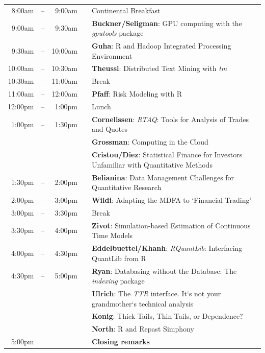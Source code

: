 \documentclass[11pt]{article}
\newcommand{\mylinecolor}[1]{\color{#1}\vspace{-8pt}}  %
\begin{document}
\begin{tabular}{rlrlp{5in}}
  8:00am  & -- &  9:00am &   & \small{\mylinecolor{Breaks} Continental Breakfast}  \\
  9:00am  & -- &  9:30am &   & \textbf{\color{Talk} Buckner/Seligman}: \small{GPU computing with the \emph{gputools} package} \\
  9:30am  & -- & 10:00am &   & \textbf{\color{Talk} Guha}: \small{R and Hadoop Integrated Processing Environment} \\
  10:00am & -- & 10:30am &   & \textbf{\color{Talk} Theussl}: \small{Distributed Text Mining with \emph{tm}} \\
  10:30am & -- & 11:00am &   & \small{\mylinecolor{Breaks}  Break}  \\
  11:00am & -- & 12:00am &   & \textbf{\color{KeynoteTalk} Pfaff}: \small{Risk Modeling with R} \\
  12:00pm & -- &  1:00pm &   & \small{\mylinecolor{Breaks}  Lunch}  \\
   1:00pm & -- &  1:30pm &   & \textbf{\color{LightningTalk} Cornelissen}: \small{\emph{RTAQ}: Tools for Analysis of Trades and Quotes} \\
          &    &         &   & \textbf{\color{LightningTalk} Grossman}: \small{Computing in the Cloud} \\
          &    &         &   & \textbf{\color{LightningTalk} Cristou/Diez}: \small{Statistical Finance for Investors Unfamiliar with Quantitative Methods} \\
   1:30pm & -- & 2:00pm  &   & \textbf{\color{Talk} Belianina}: \small{Data Management Challenges for Quantitative Research} \\
   2:00pm & -- & 3:00pm  &   & \textbf{\color{KeynoteTalk} Wildi}: \small{Adapting the MDFA to `Financial Trading'} \\
   3:00pm & -- & 3:30pm  &   & \small{\mylinecolor{Breaks} Break} \\
   3:30pm & -- & 4:00pm  &   & \textbf{\color{Talk} Zivot}: \small{Simulation-based Estimation of Continuous Time Models} \\
   4:00pm & -- & 4:30pm  &   & \textbf{\color{Talk} Eddelbuettel/Khanh}: \small{\emph{RQuantLib}: Interfacing QuantLib from R} \\
   4:30pm & -- & 5:00pm  &   & \textbf{\color{LightningTalk} Ryan}: \small{Databasing without the Database: The \emph{indexing} package} \\
          &    &         &   & \textbf{\color{LightningTalk} Ulrich}: \small{The \emph{TTR} interface.  It`s not your grandmother`s technical analysis} \\
          &    &         &   & \textbf{\color{LightningTalk} Konig}: \small{Thick Tails, Thin Tails, or Dependence?} \\
          &    &         &   & \textbf{\color{LightningTalk} North}: \small{R and Repast Simphony} \\
   5:00pm &    &         &   & \textbf{\color{Breaks} Closing remarks} \\
\end{tabular}
\end{document}
